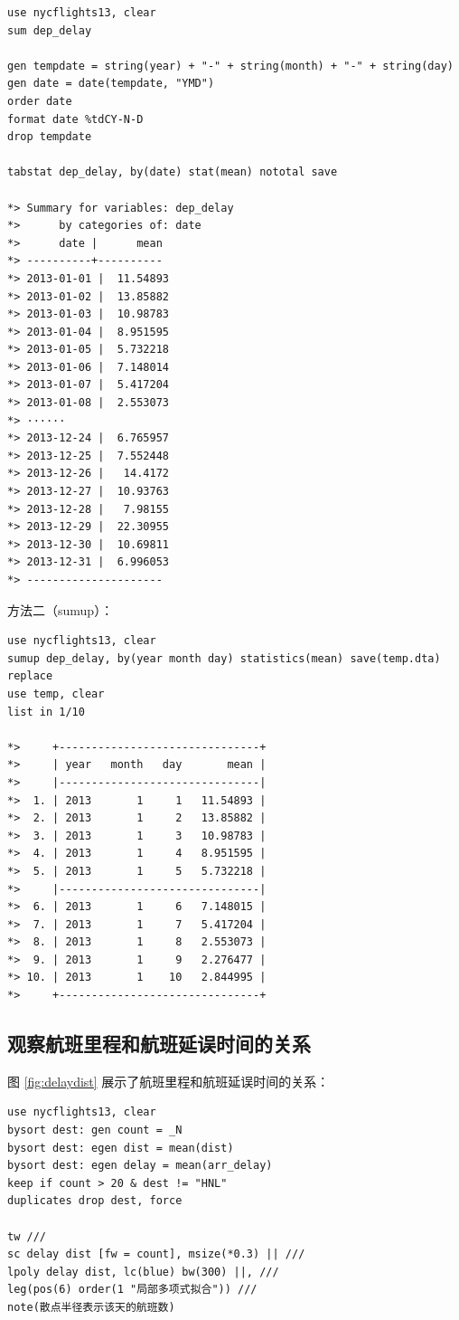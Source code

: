 \begin{lstlisting}
use nycflights13, clear
sum dep_delay

gen tempdate = string(year) + "-" + string(month) + "-" + string(day)
gen date = date(tempdate, "YMD")
order date
format date %tdCY-N-D
drop tempdate

tabstat dep_delay, by(date) stat(mean) nototal save

*> Summary for variables: dep_delay
*>      by categories of: date
*>      date |      mean
*> ----------+----------
*> 2013-01-01 |  11.54893
*> 2013-01-02 |  13.85882
*> 2013-01-03 |  10.98783
*> 2013-01-04 |  8.951595
*> 2013-01-05 |  5.732218
*> 2013-01-06 |  7.148014
*> 2013-01-07 |  5.417204
*> 2013-01-08 |  2.553073
*> ······
*> 2013-12-24 |  6.765957
*> 2013-12-25 |  7.552448
*> 2013-12-26 |   14.4172
*> 2013-12-27 |  10.93763
*> 2013-12-28 |   7.98155
*> 2013-12-29 |  22.30955
*> 2013-12-30 |  10.69811
*> 2013-12-31 |  6.996053
*> ---------------------
\end{lstlisting}

方法二（sumup）：

\begin{lstlisting}
use nycflights13, clear
sumup dep_delay, by(year month day) statistics(mean) save(temp.dta) replace
use temp, clear
list in 1/10

*>     +-------------------------------+
*>     | year   month   day       mean |
*>     |-------------------------------|
*>  1. | 2013       1     1   11.54893 |
*>  2. | 2013       1     2   13.85882 |
*>  3. | 2013       1     3   10.98783 |
*>  4. | 2013       1     4   8.951595 |
*>  5. | 2013       1     5   5.732218 |
*>     |-------------------------------|
*>  6. | 2013       1     6   7.148015 |
*>  7. | 2013       1     7   5.417204 |
*>  8. | 2013       1     8   2.553073 |
*>  9. | 2013       1     9   2.276477 |
*> 10. | 2013       1    10   2.844995 |
*>     +-------------------------------+
\end{lstlisting}

\subsection{观察航班里程和航班延误时间的关系}

图 \ref{fig:delaydist} 展示了航班里程和航班延误时间的关系：

\begin{lstlisting}
use nycflights13, clear
bysort dest: gen count = _N
bysort dest: egen dist = mean(dist)
bysort dest: egen delay = mean(arr_delay)
keep if count > 20 & dest != "HNL"
duplicates drop dest, force

tw ///
sc delay dist [fw = count], msize(*0.3) || ///
lpoly delay dist, lc(blue) bw(300) ||, ///
leg(pos(6) order(1 "局部多项式拟合")) ///
note(散点半径表示该天的航班数)
\end{lstlisting}

